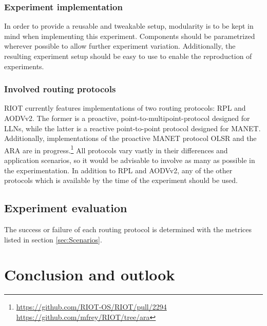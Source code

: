 \documentclass{acm_proc_article-sp}
\begin{document}
\subsubsection{Experiment implementation}
\label{subsec:implementation}
In order to provide a reusable and tweakable setup, modularity is to be kept in mind when implementing this experiment. Components should be parametrized wherever possible to allow further experiment variation. Additionally, the resulting experiment setup should be easy to use to enable the reproduction of experiments.

\subsubsection{Involved routing protocols}
\label{subsec:protocols}
RIOT currently features implementations of two routing protocols: RPL\cite{RFC-6550} and AODVv2\cite{draft-ietf-manet-aodvv2-09}. The former is a proactive, point-to-multipoint-protocol designed for \glspl{LLN}, while the latter is a reactive point-to-point protocol designed for \gls{MANET}. Additionally, implementations of the proactive \gls{MANET} protocol OLSR\cite{RFC-3626} and the \gls{ARA}\cite{ara} are in progress.\footnote{ \url{https://github.com/RIOT-OS/RIOT/pull/2294}\\  \url{https://github.com/mfrey/RIOT/tree/ara}}
All protocols vary vastly in their differences and application scenarios, so it would be advisable to involve as many as possible in the experimentation. In addition to RPL and AODVv2, any of the other protocols which is available by the time of the experiment should be used.

\subsection{Experiment evaluation}
\label{subsec:evaluation}
The success or failure of each routing protocol is determined with the metrices listed in section \ref{sec:Scenarios}.


\section{Conclusion and outlook}
\label{sec:Conclusion}




\end{document}
